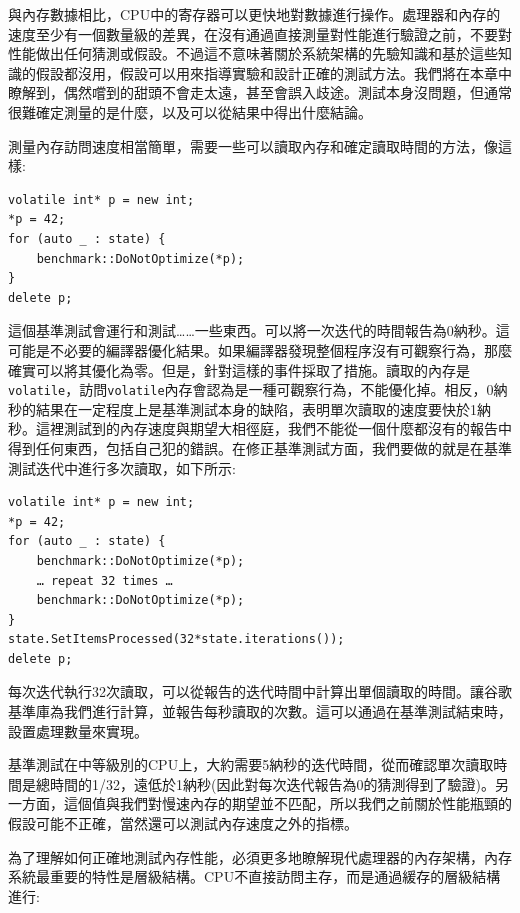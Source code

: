 
與內存數據相比，CPU中的寄存器可以更快地對數據進行操作。處理器和內存的速度至少有一個數量級的差異，在沒有通過直接測量對性能進行驗證之前，不要對性能做出任何猜測或假設。不過這不意味著關於系統架構的先驗知識和基於這些知識的假設都沒用，假設可以用來指導實驗和設計正確的測試方法。我們將在本章中瞭解到，偶然嚐到的甜頭不會走太遠，甚至會誤入歧途。測試本身沒問題，但通常很難確定測量的是什麼，以及可以從結果中得出什麼結論。

測量內存訪問速度相當簡單，需要一些可以讀取內存和確定讀取時間的方法，像這樣:

\begin{lstlisting}[style=styleCXX]
volatile int* p = new int;
*p = 42;
for (auto _ : state) {
	benchmark::DoNotOptimize(*p);
}
delete p;
\end{lstlisting}

這個基準測試會運行和測試……一些東西。可以將一次迭代的時間報告為0納秒。這可能是不必要的編譯器優化結果。如果編譯器發現整個程序沒有可觀察行為，那麼確實可以將其優化為零。但是，針對這樣的事件採取了措施。讀取的內存是\texttt{volatile}，訪問\texttt{volatile}內存會認為是一種可觀察行為，不能優化掉。相反，0納秒的結果在一定程度上是基準測試本身的缺陷，表明單次讀取的速度要快於1納秒。這裡測試到的內存速度與期望大相徑庭，我們不能從一個什麼都沒有的報告中得到任何東西，包括自己犯的錯誤。在修正基準測試方面，我們要做的就是在基準測試迭代中進行多次讀取，如下所示:

\begin{lstlisting}[style=styleCXX]
volatile int* p = new int;
*p = 42;
for (auto _ : state) {
	benchmark::DoNotOptimize(*p);
	… repeat 32 times …
	benchmark::DoNotOptimize(*p);
}
state.SetItemsProcessed(32*state.iterations());
delete p;
\end{lstlisting}

每次迭代執行32次讀取，可以從報告的迭代時間中計算出單個讀取的時間。讓谷歌基準庫為我們進行計算，並報告每秒讀取的次數。這可以通過在基準測試結束時，設置處理數量來實現。

基準測試在中等級別的CPU上，大約需要5納秒的迭代時間，從而確認單次讀取時間是總時間的1/32，遠低於1納秒(因此對每次迭代報告為0的猜測得到了驗證)。另一方面，這個值與我們對慢速內存的期望並不匹配，所以我們之前關於性能瓶頸的假設可能不正確，當然還可以測試內存速度之外的指標。


為了理解如何正確地測試內存性能，必須更多地瞭解現代處理器的內存架構，內存系統最重要的特性是層級結構。CPU不直接訪問主存，而是通過緩存的層級結構進行:

